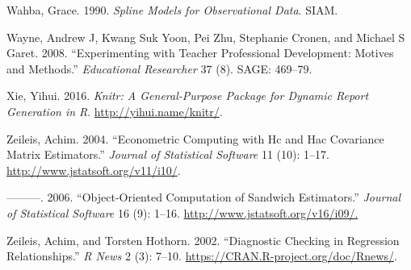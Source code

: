 \documentclass[12pt,]{article}
\begin{document}
\hypertarget{ref-wahba}{}
Wahba, Grace. 1990. \emph{Spline Models for Observational Data}. SIAM.

\hypertarget{ref-wayne}{}
Wayne, Andrew J, Kwang Suk Yoon, Pei Zhu, Stephanie Cronen, and Michael
S Garet. 2008. ``Experimenting with Teacher Professional Development:
Motives and Methods.'' \emph{Educational Researcher} 37 (8). SAGE:
469--79.

\hypertarget{ref-xie}{}
Xie, Yihui. 2016. \emph{Knitr: A General-Purpose Package for Dynamic
Report Generation in R}. \url{http://yihui.name/knitr/}.

\hypertarget{ref-zeileis2004}{}
Zeileis, Achim. 2004. ``Econometric Computing with Hc and Hac Covariance
Matrix Estimators.'' \emph{Journal of Statistical Software} 11 (10):
1--17. \url{http://www.jstatsoft.org/v11/i10/}.

\hypertarget{ref-zeileis2006}{}
---------. 2006. ``Object-Oriented Computation of Sandwich Estimators.''
\emph{Journal of Statistical Software} 16 (9): 1--16.
\url{http://www.jstatsoft.org/v16/i09/.}

\hypertarget{ref-zeileis2002}{}
Zeileis, Achim, and Torsten Hothorn. 2002. ``Diagnostic Checking in
Regression Relationships.'' \emph{R News} 2 (3): 7--10.
\url{https://CRAN.R-project.org/doc/Rnews/}.
\end{document}
